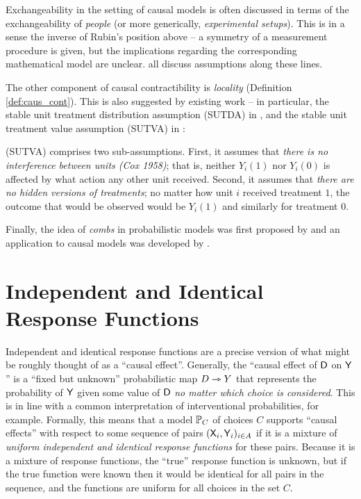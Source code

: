Exchangeability in the setting of causal models is often discussed in terms of the exchangeability of \emph{people} (or more generically, \emph{experimental setups}). This is in a sense the inverse of Rubin's position above -- a symmetry of a measurement procedure is given, but the implications regarding the corresponding mathematical model are unclear. \citet{hernan_beyond_2012,greenland_identifiability_1986,banerjee_chapter_2017,dawid_decision-theoretic_2020} all discuss assumptions along these lines.

The other component of causal contractibility is \emph{locality} (Definition \ref{def:caus_cont}). This is also suggested by existing work -- in particular, the stable unit treatment distribution assumption (SUTDA) in \citet{dawid_decision-theoretic_2020}, and the stable unit treatment value assumption (SUTVA) in \citep{rubin_causal_2005}:
\begin{blockquote}
(SUTVA) comprises two sub-assumptions. First, it assumes that \emph{there is no interference between units (Cox 1958)}; that is, neither $Y_i(1)$ nor $Y_i(0)$ is affected by what action any other unit received. Second, it assumes that \emph{there are no hidden versions of treatments}; no matter how unit $i$ received treatment $1$, the outcome that would be observed would be $Y_i(1)$ and similarly for treatment $0$.
\end{blockquote}

Finally, the idea of \emph{combs} in probabilistic models was first proposed by \citet{chiribella_quantum_2008} and an application to causal models was developed by \citet{jacobs_causal_2019}.

\section{Independent and Identical Response Functions}\label{sec:response_functions}

Independent and identical response functions are a precise version of what might be roughly thought of as a ``causal effect''. Generally, the ``causal effect of $\mathsf{D}$ on $\mathsf{Y}$'' is a ``fixed but unknown'' probabilistic map $D\rightarrowtriangle Y$ that represents the probability of $\mathsf{Y}$ given some value of $\mathsf{D}$ \emph{no matter which choice is considered}. This is in line with a common interpretation of interventional probabilities, for example. Formally, this means that a model $\mathbb{P}_C$ of choices $C$ supports ``causal effects'' with respect to some sequence of pairs $(\mathsf{X}_i,\mathsf{Y}_i)_{i\in A}$ if it is a mixture of \emph{uniform independent and identical response functions} for these pairs. Because it is a mixture of response functions, the ``true'' response function is unknown, but if the true function were known then it would be identical for all pairs in the sequence, and the functions are uniform for all choices in the set $C$.

